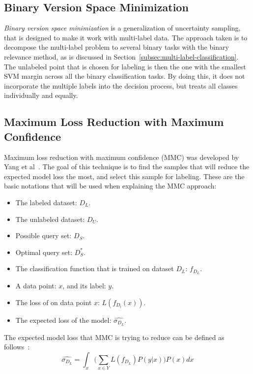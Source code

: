 \subsection{Binary Version Space Minimization}\label{subsec:binmin}

\textit{Binary version space minimization} is a generalization of uncertainty sampling, that is designed to make it work with multi-label data.
The approach taken is to decompose the multi-label problem to several binary tasks with the binary relevance method, as is discussed in Section~\ref{subsec:multi-label-classification}.
The unlabeled point that is chosen for labeling is then the one with the smallest SVM margin across all the binary classification tasks.
By doing this, it does not incorporate the multiple labels into the decision process, but treats all classes individually and equally. 

\subsection{Maximum Loss Reduction with Maximum Confidence}\label{subsec:mmc}

Maximum loss reduction with maximum confidence (MMC) was developed by Yang et al~\cite{yang2009effective}.
The goal of this technique is to find the samples that will reduce the expected model loss the most, and select this sample for labeling.
These are the basic notations that will be used when explaining the MMC approach:
\begin{itemize}
    \item The labeled dataset: $D_L$.
    \item The unlabeled dataset: $D_U$.
    \item Possible query set: $D_S$.
    \item Optimal query set: $D^*_S$.
    \item The classification function that is trained on dataset $D_L$: $f_{D_L}$.
    \item A data point: $x$, and its label: $y$.
    \item The loss of on data point $x$: $L(f_{D_l}(x))$.
    \item The expected loss of the model: $\widehat{\sigma_{D_L}}$.
\end{itemize}

The expected model loss that MMC is trying to reduce can be defined as follows~\cite{yang2009effective}:
\begin{equation}
    \widehat{\sigma_{D_L}} = \int_x \bigg ( \sum_{x \in Y} L(f_{D_L})P(y|x) \bigg ) P(x)dx
\end{equation}

